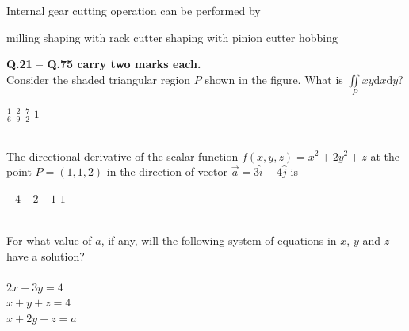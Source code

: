 \documentclass[addpoints,11pt]{exam}
\begin{document}
\begin{questions}
    \question Internal gear cutting operation can be performed by\\
    \begin{choices}
        \choice milling
        \choice shaping with rack cutter
        \choice shaping with pinion cutter
        \choice hobbing
    \end{choices}
    \pagebreak
    \large\textbf{Q.21 -- Q.75 carry two marks each.}\\
    \question Consider the shaded triangular region $P$ shown in the figure. What is $\iint\limits_P xy\mathrm{d}x\mathrm{d}y$?\\
    \begin{center}
    \end{center}

    \begin{oneparchoices}
        \choice $\frac{1}{6}$
        \choice $\frac{2}{9}$
        \choice $\frac{7}{2}$
        \choice $1$
    \end{oneparchoices}\\
    
    \question The directional derivative of the scalar function $f(x,y,z) = x^2 + 2y^2 + z$ at the point $P=(1,1,2)$ in the direction of vector $\overrightarrow{a} = 3\hat{i} -4\hat{j}$ is\\

    \begin{oneparchoices}
        \choice $-4$
        \choice $-2$
        \choice $-1$
        \choice $1$
    \end{oneparchoices}\\
    \question For what value of $a$, if any, will the following system of equations in $x$, $y$ and $z$ have a solution?\\\\
    $2x+3y=4$\\$x+y+z=4$\\$x+2y-z=a$


\end{questions}
\end{document}
